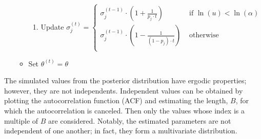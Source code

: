 \documentclass[11pt,fleqn]{book} %
\begin{document}
\begin{algorithm}
\begin{enumerate}
\begin{itemize}
\begin{enumerate}[label=\alph*.]
				\item Update $\sigma_j^{(t)} = \left\{
					\begin{array}{ll}
						\sigma_j^{(t-1)} \cdot \left( 1 + \frac{1}{p_j \cdot t} \right) & \text{ if } \ln(u) < \ln(\alpha) \\
						\sigma_j^{(t-1)} \cdot \left( 1 - \frac{1}{(1-p_j) \cdot t} \right) & \text{ otherwise } \\
					\end{array}
				\right.$
			\end{enumerate}
			\item Set $\theta^{(t)}=\theta$
		\end{itemize}
	\end{enumerate}
\end{algorithm}

The simulated values from the posterior distribution have ergodic properties;
however, they are not independents. Independent values can be obtained by 
plotting the autocorrelation function (ACF) and estimating the length, $B$, 
for which the autocorrelation is canceled. Then only the values whose index 
is a multiple of $B$ are considered. Notably, the estimated parameters are 
not independent of one another; in fact, they form a multivariate distribution.
\end{document}
